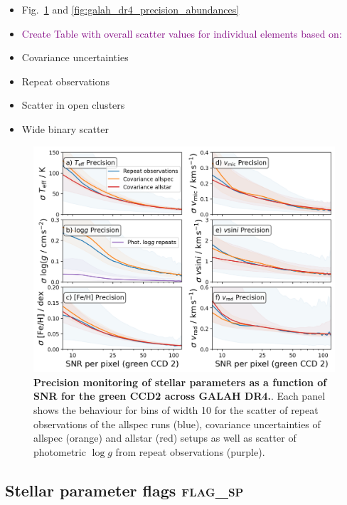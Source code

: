 \documentclass[
  journal=pasa,
  manuscript=research-paper, %
  year=2024,
  volume=37
]{cup-journal}
\newcommand{\SB}[1]{{\textcolor{purple}{#1}}}
\newcommand{\logg}{$\log g$\xspace}
\begin{document}
\begin{itemize}
    \item Fig.~\ref{fig:galah_dr4_precision_parameters} and \ref{fig:galah_dr4_precision_abundances}
    \item \SB{Create Table with overall scatter values for individual elements based on:}
    \item Covariance uncertainties
    \item Repeat observations
    \item Scatter in open clusters
    \item Wide binary scatter
\end{itemize}

\begin{figure}[ht]
 \centering
 \includegraphics[width=\textwidth]{figures/galah_dr4_precision_parameters.png}
 \caption{\textbf{Precision monitoring of stellar parameters as a function of SNR for the green CCD2 across GALAH DR4.}. Each panel shows the behaviour for bins of width 10 for the scatter of repeat observations of the allspec runs (blue), covariance uncertainties of allspec (orange) and allstar (red) setups as well as scatter of photometric \logg from repeat observations (purple).}
 \label{fig:galah_dr4_precision_parameters}
\end{figure}

\subsection{Stellar parameter flags \textsc{flag\_sp}}
\label{sec:flag_sp}
\end{document}
